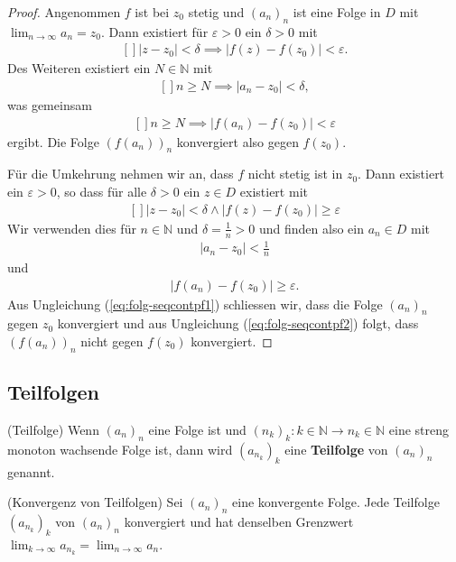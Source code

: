 \documentclass[../Analysis1_script.tex]{subfiles}
\begin{document}
\begin{proof}
	Angenommen $f$ ist bei $z_0$ stetig und $(a_n)_n$ ist eine Folge in $D$ mit $\lim _{n\to \infty }a_n = z_0$. Dann existiert für $\varepsilon >0$ ein $\delta >0$ mit
	\[\begin{aligned}[]
		|z-z_0|<\delta \implies |f(z)-f(z_0)| < \varepsilon .
	\end{aligned}\]
	Des Weiteren existiert ein $N \in \mathbb {N}$ mit
	\[\begin{aligned}[]
		n \geq N \implies |a_n - z_0| < \delta ,
	\end{aligned}\]
	was gemeinsam
	\[\begin{aligned}[]
		n \geq N \implies |f(a_n) - f(z_0)| <\varepsilon
	\end{aligned}\]
	ergibt. Die Folge $(f(a_n))_n$ konvergiert also gegen $f(z_0)$.
	
	Für die Umkehrung nehmen wir an, dass $f$ nicht stetig ist in $z_0$. Dann existiert ein $\varepsilon >0$, so dass für alle $\delta >0$ ein $z\in D$ existiert mit
	\[\begin{aligned}[]
		|z-z_0| < \delta \wedge |f(z)-f(z_0)| \geq \varepsilon
	\end{aligned}\]
	 Wir verwenden dies für $n\in \mathbb {N}$ und $\delta = \frac {1}{n}>0$ und finden also ein $a_n \in D$ mit
	\begin{align}\label{eq:folg-seqcontpf1} 
		|a_n -z_0|< \frac {1}{n}
	\end{align}
	und
	\begin{align}\label{eq:folg-seqcontpf2} 
		|f(a_n)-f(z_0)| \geq \varepsilon .
	\end{align}
	Aus Ungleichung (\ref{eq:folg-seqcontpf1}) schliessen wir, dass die Folge $(a_n)_n$ gegen $z_0$ konvergiert und aus Ungleichung (\ref{eq:folg-seqcontpf2}) folgt, dass $(f(a_n))_n$ nicht gegen $f(z_0)$ konvergiert.
\end{proof}

\subsection{Teilfolgen}

\begin{definition}{(Teilfolge)}
	Wenn $(a_n)_n$ eine Folge ist und $(n_k)_k:k \in \mathbb {N} \to n_k \in \mathbb {N}$ eine streng monoton wachsende Folge ist, dann wird $(a_{n_k})_k$ eine \textbf{Teilfolge} von $(a_n)_n$ genannt. 
\end{definition}

\begin{lemma}{(Konvergenz von Teilfolgen)}
	Sei $(a_n)_n$ eine konvergente Folge. Jede Teilfolge $(a_{n_k})_k$ von $(a_n)_n$ konvergiert und hat denselben Grenzwert $\lim _{k\to \infty }a_{n_k} = \lim _{n\to \infty } a_n$. 
\end{lemma}
\end{document}
